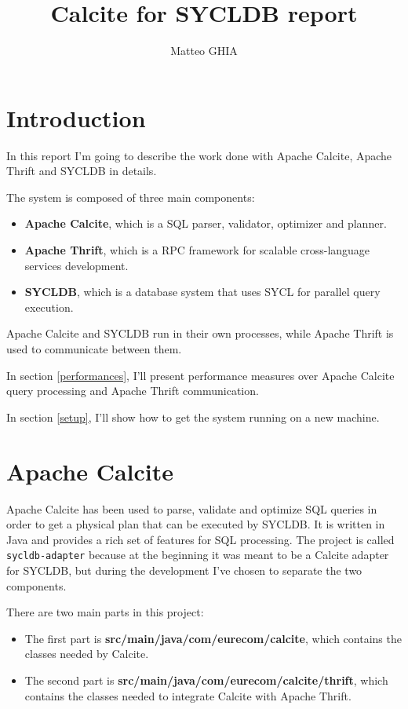 \documentclass[a4paper, 10pt]{article}
\title{Calcite for SYCLDB report}
\author{Matteo GHIA}
\begin{document}
\maketitle

\section{Introduction}

In this report I'm going to describe the work done with Apache Calcite, Apache Thrift and SYCLDB in details.

The system is composed of three main components:
\begin{itemize}
    \item \textbf{Apache Calcite}, which is a SQL parser, validator, optimizer and planner.
    \item \textbf{Apache Thrift}, which is a RPC framework for scalable cross-language services development.
    \item \textbf{SYCLDB}, which is a database system that uses SYCL for parallel query execution.
\end{itemize}
Apache Calcite and SYCLDB run in their own processes, while Apache Thrift is used to communicate between them.

In section \ref{performances}, I'll present performance measures over Apache Calcite query processing and Apache Thrift communication.

In section \ref{setup}, I'll show how to get the system running on a new machine.

\section{Apache Calcite}

Apache Calcite has been used to parse, validate and optimize SQL queries in order to get a physical plan that can be executed by SYCLDB. It is written in Java and provides a rich set of features for SQL processing. The project is called \texttt{sycldb-adapter} because at the beginning it was meant to be a Calcite adapter for SYCLDB, but during the development I've chosen to separate the two components.

There are two main parts in this project:
\begin{itemize}
    \item The first part is \textbf{src/main/java/com/eurecom/calcite}, which contains the classes needed by Calcite.
    \item The second part is \textbf{src/main/java/com/eurecom/calcite/thrift}, which contains the classes needed to integrate Calcite with Apache Thrift.
\end{itemize}
\end{document}
